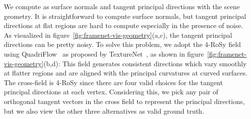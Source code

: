 We compute \cframe{} as surface normals and tangent principal directions with the scene geometry. It is straightforward to compute surface normals, but tangent principal directions at flat regions are hard to compute especially in the presence of noise. As visualized in figure~\ref{fig:framenet-vis-geometry}(a,c), the tangent principal directions can be pretty noisy. To solve this problem, we adopt the 4-RoSy field using QuadriFlow~\cite{huang2018quadriflow} as proposed by TextureNet~\cite{huang2018texturenet}, as shown in figure~\ref{fig:framenet-vis-geometry}(b,d): This field generates consistent directions which vary smoothly at flatter regions and are aligned with the principal curvatures at curved surfaces. The cross-field is 4-RoSy since there are four valid choices for the tangent principal directions at each vertex. Considering this, we pick any pair of orthogonal tangent vectors in the cross field to represent the principal directions, but we also view the other three alternatives as valid ground truth.

